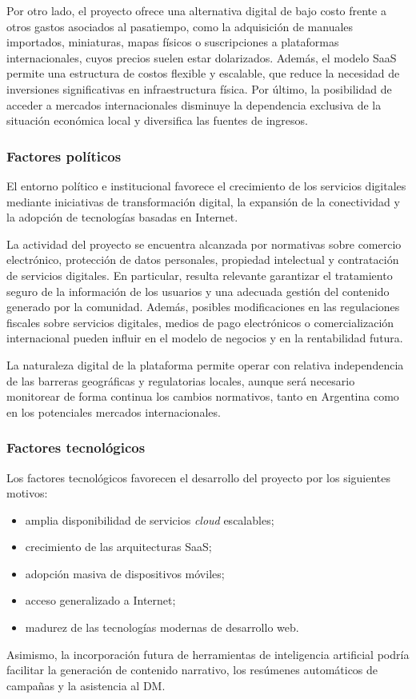 Por otro lado, el proyecto ofrece una alternativa digital de bajo costo frente a otros gastos asociados al pasatiempo, como la adquisición de manuales importados, miniaturas, mapas físicos o suscripciones a plataformas internacionales, cuyos precios suelen estar dolarizados. Además, el modelo SaaS permite una estructura de costos flexible y escalable, que reduce la necesidad de inversiones significativas en infraestructura física. Por último, la posibilidad de acceder a mercados internacionales disminuye la dependencia exclusiva de la situación económica local y diversifica las fuentes de ingresos.

\subsubsection{Factores políticos}\label{sec:politicos}
El entorno político e institucional favorece el crecimiento de los servicios digitales mediante iniciativas de transformación digital, la expansión de la conectividad y la adopción de tecnologías basadas en Internet.

La actividad del proyecto se encuentra alcanzada por normativas sobre comercio electrónico, protección de datos personales, propiedad intelectual y contratación de servicios digitales. En particular, resulta relevante garantizar el tratamiento seguro de la información de los usuarios y una adecuada gestión del contenido generado por la comunidad. Además, posibles modificaciones en las regulaciones fiscales sobre servicios digitales, medios de pago electrónicos o comercialización internacional pueden influir en el modelo de negocios y en la rentabilidad futura.

La naturaleza digital de la plataforma permite operar con relativa independencia de las barreras geográficas y regulatorias locales, aunque será necesario monitorear de forma continua los cambios normativos, tanto en Argentina como en los potenciales mercados internacionales.

\subsubsection{Factores tecnológicos}\label{sec:tecnologicos}
Los factores tecnológicos favorecen el desarrollo del proyecto por los siguientes motivos:
\begin{itemize}
  \item amplia disponibilidad de servicios \textit{cloud} escalables;
  \item crecimiento de las arquitecturas SaaS;
  \item adopción masiva de dispositivos móviles;
  \item acceso generalizado a Internet;
  \item madurez de las tecnologías modernas de desarrollo web.
\end{itemize}
Asimismo, la incorporación futura de herramientas de inteligencia artificial podría facilitar la generación de contenido narrativo, los resúmenes automáticos de campañas y la asistencia al DM.

